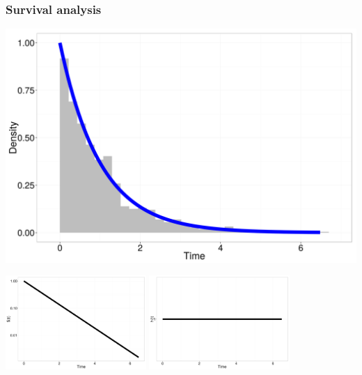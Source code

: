 \documentclass{beamer}
\begin{document}
\begin{frame}
  \frametitle{Survival analysis}

  \begin{center}
    \includegraphics[height = 0.5\textheight, width = \textwidth, keepaspectratio = true]{figure/dur_exp}

    \includegraphics[height = 0.5\textheight, width = 0.4\textwidth, keepaspectratio = true]{figure/sur_exp}
    \includegraphics[height = 0.5\textheight, width = 0.4\textwidth, keepaspectratio = true]{figure/haz_exp}
  \end{center}
\end{frame}
\end{document}
